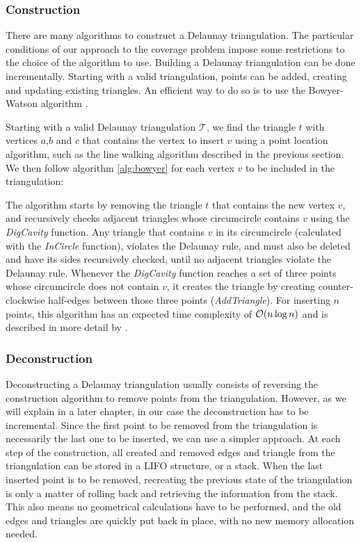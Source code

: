 \subsubsection*{Construction}
\label{sect:dtconst}

There are many algorithms to construct a Delaunay triangulation. 
The particular conditions of our approach to the coverage problem impose some restrictions to the choice of the algorithm to use.
Building a Delaunay triangulation can be done incrementally. Starting with a valid triangulation, points can be added, creating and updating existing triangles. An efficient way to do so is to use the Bowyer-Watson algorithm \cite{bwalgo}.

Starting with a valid Delaunay triangulation $\mathcal{T}$, we find the triangle $t$ with vertices $a$,$b$ and $c$ that contains the vertex to insert $v$ using a point location algorithm, such as the line walking algorithm described in the previous section. We then follow algorithm \ref{alg:bowyer} for each vertex $v$ to be included in the triangulation:


The algorithm starts by removing the triangle $t$ that contains the new vertex $v$, and recursively checks adjacent triangles whose circumcircle contains $v$ using the \emph{DigCavity} function. Any triangle that contains $v$ in its circumcircle (calculated with the \emph{InCircle} function), violates the Delaunay rule, and must also be deleted and have its sides recursively checked, until no adjacent triangles violate the Delaunay rule. Whenever the \emph{DigCavity} function reaches a set of three points whose circumcircle does not contain $v$, it creates the triangle by creating counter-clockwise half-edges between those three points (\emph{AddTriangle}). For inserting $n$ points, this algorithm has an expected time complexity of $\mathcal{O}(n \log n)$ and is described in more detail by \citet{tricomplex}.

\subsubsection*{Deconstruction}
Deconstructing a Delaunay triangulation usually consists of reversing the construction algorithm to remove points from the triangulation. However, as we will explain in a later chapter, in our case the deconstruction has to be incremental. Since the first point to be removed from the triangulation is necessarily the last one to be inserted, we can use a simpler approach. 
At each step of the construction, all created and removed edges and triangle from the triangulation can be stored in a LIFO structure, or a stack. When the last inserted point is to be removed, recreating the previous state of the triangulation is only a matter of rolling back and retrieving the information from the stack. This also means no geometrical calculations have to be performed, and the old edges and triangles are quickly put back in place, with no new memory allocation needed.

